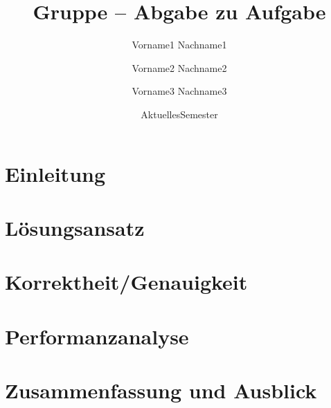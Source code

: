 \documentclass[course=asp]{aspdoc}
\author{Vorname1 Nachname1 \and Vorname2 Nachname2 \and Vorname3 Nachname3}
\date{AktuellesSemester} %
\title{Gruppe \theGroup{} -- Abgabe zu Aufgabe \theNumber}
\begin{document}
\maketitle

\section{Einleitung}


\section{Lösungsansatz}


\section{Korrektheit/Genauigkeit}


\section{Performanzanalyse}


\section{Zusammenfassung und Ausblick}


{}
\end{document}
